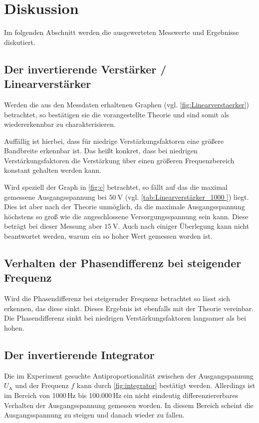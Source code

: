 \newpage
\section{Diskussion}
Im folgenden Abschnitt werden die ausgewerteten Messwerte und Ergebnisse diskutiert.

\subsection{Der invertierende Verstärker / Linearverstärker}
Werden die aus den Messdaten erhaltenen Graphen (vgl. \autoref{fig:Linearverstaerker})
betrachtet, so bestätigen sie die vorangestellte Theorie und sind somit als 
wiedererkennbar zu charakterisieren. 

Auffällig ist hierbei, dass für niedrige Verstärkungsfaktoren eine größere Bandbreite erkennbar ist.
Das heißt konkret, dass bei niedrigen Verstärkungsfaktoren die Verstärkung über einen
größeren Frequenzbereich konstant gehalten werden kann.

Wird speziell der Graph in \autoref{fig:c} betrachtet, so fällt auf das die 
maximal gemessene Ausgangsspannung bei $\SI{50}{\volt}$ (vgl. \autoref{tab:Linearverstärker_1000 }) liegt. 
Dies ist aber nach der Theorie unmöglich, da die maximale Ausgangsspannung höchstens so groß wie 
die angeschlossene Versorgungsspannung sein kann. 
Diese beträgt bei dieser Messung aber $\SI{15}{\volt}$. 
Auch nach einiger Überlegung kann nicht beantwortet werden, warum ein so hoher Wert gemessen worden ist.

\subsection{Verhalten der Phasendifferenz bei steigender Frequenz}
Wird die Phasendifferenz bei steigernder Frequenz betrachtet so lässt sich erkennen, das diese sinkt. 
Dieses Ergebnis ist ebenfalls mit der Theorie vereinbar.
Die Phasendifferenz sinkt bei niedrigen Verstärkungsfaktoren langsamer als bei hohen.

\subsection{Der invertierende Integrator}
Die im Experiment gesuchte Antiproportionalität zwischen der Ausgangspannung $U_\text{A}$ und der Frequenz
$f$ kann durch \autoref{fig:integrator} bestätigt werden.
Allerdings ist im Bereich von 1000\,Hz bis 100.000\,Hz ein nicht eindeutig differenziererbares 
Verhalten der Ausgangsspannung gemessen worden. 
In diesem Bereich scheint die Ausgangsspannung zu steigen und danach wieder zu fallen.

